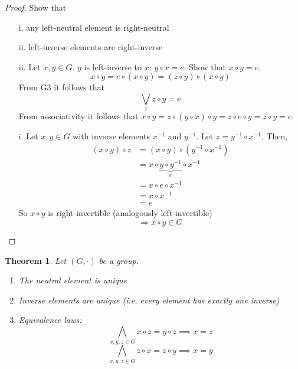 \documentclass[a4paper,landscape,twocolumn]{article}
\newtheorem{theorem}{Theorem}[section]
\begin{document}
\begin{proof}
  Show that
  \begin{itemize}
    \item[i.] any left-neutral element is right-neutral
    \item[ii.] left-inverse elements are right-inverse
  \end{itemize}

  \begin{itemize}
    \item[ii.]  Let $x, y \in G$. $y$ is left-inverse to $x$: $y \circ x = e$.
      Show that $x \circ y = e$.
      \[ x \circ y = e \circ (x \circ y) = (z \circ y) \circ (x \circ y) \]
      From G3 it follows that
      \[ \bigvee_{z} z \circ y = e \]
      From associativity it follows that $x \circ y = z \circ (y \circ x) \circ y = z \circ e \circ y = z \circ y = e$.
    \item[i.]
      Let $x, y \in G$ with inverse elements $x^{-1}$ and $y^{-1}$.
      Let $z = y^{-1} \circ x^{-1}$. Then,
      \begin{align*}
        (x \circ y) \circ z &= (x \circ y) \circ (y^{-1} \circ x^{-1}) \\
          &= x \circ \underbrace{y \circ y^{-1}}_{e} \circ x^{-1} \\
          &= x \circ e \circ x^{-1} \\
          &= x \circ x^{-1} \\
          &= e
      \end{align*}
      So $x \circ y$ is right-invertible (analogously left-invertible)
      \[ \Rightarrow x \circ y \in G \]


  \end{itemize}
\end{proof}

\begin{theorem}
  \label{satz-2-10}
  Let $(G, \cdot)$ be a group.
  \begin{enumerate}
    \item The neutral element is unique
    \item Inverse elements are unique (i.e. every element has exactly one inverse)
    \item Equivalence laws:
      \[ \bigwedge_{x,y,z \in G} x \circ z = y \circ z \implies x = z \]
      \[ \bigwedge_{x,y,z \in G} z \circ x = z \circ y \implies x = y \]
  \end{enumerate}
\end{theorem}
\end{document}
